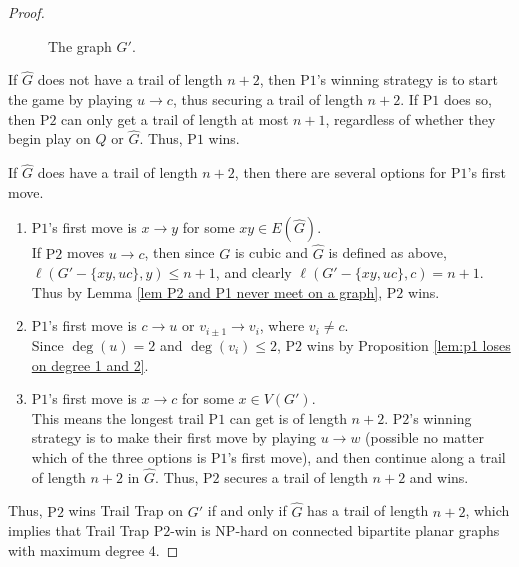 \documentclass{article}
\theoremstyle{plain}
\theoremstyle{definition}
\newcommand{\x}{\times}
\newcommand{\MaxTrail}{\ell}
\def\pone{{\rm{P}\ensuremath{1}}}
\def\ptwo{{\rm{P}\ensuremath{2}}}
\def\poneposs{{\rm{P}\ensuremath{1}'s}}
\def\ptwoposs{{\rm{P}\ensuremath{2}'s}}
\begin{document}
\begin{proof}
\begin{figure}[h!!]

\caption{The graph $G'$.}
\label{fig:G'}
\end{figure}
   
If $\widehat{G}$ does not have a trail of length $n+2$, then \poneposs{} winning strategy is to start the game by playing $u \to c$, thus securing a trail of length $n+2$. If \pone{} does so, then \ptwo{} can only get a trail of length at most $n+1$, regardless of whether they begin play on $Q$ or $\widehat{G}$. Thus, \pone{} wins.

If $\widehat{G}$ does have a trail of length $n+2$, then there are several options for \poneposs{} first move.
\begin{enumerate}
\item [(i)] \poneposs{} first move is $x \to y$ for some $xy \in E(\widehat{G})$.\\  If \ptwo{} moves $u \to c$, then since $G$ is cubic and $\widehat{G}$ is defined as above, $\MaxTrail(G'-\{xy,uc\}, y) \leq n+1$, and clearly $\MaxTrail(G'-\{xy,uc\}, c) = n+1$. Thus by Lemma \ref{lem P2 and P1 never meet on a graph}, \ptwo{} wins.

\item [(ii)] \poneposs{} first move is $c \to u$ or $v_{i \pm 1} \to v_{i}$, where $v_i \neq c$.\\
        Since $\deg(u) = 2$ and $\deg(v_i) \leq 2$, \ptwo{} wins by Proposition \ref{lem:p1 loses on degree 1 and 2}. 

\item [(iii)] \poneposs{} first move is $x \to c$ for some $x \in V(G')$.\\ This means the longest trail \pone{} can get is of length $n+2$. \ptwoposs{} winning strategy is to make their first move by playing $u\to w$ (possible no matter which of the three options is \poneposs{} first move), and then continue along a trail of length $n+2$ in $\widehat{G}$. Thus, \ptwo{} secures a trail of length $n+2$ and wins.
\end{enumerate}    

    Thus, \ptwo{} wins {\sc Trail Trap} on $G'$ if and only if $\widehat{G}$ has a trail of length $n+2$, which implies that {\sc Trail Trap \ptwo{}-win} is NP-hard on connected bipartite planar graphs with maximum degree 4.
\end{proof}
\end{document}
